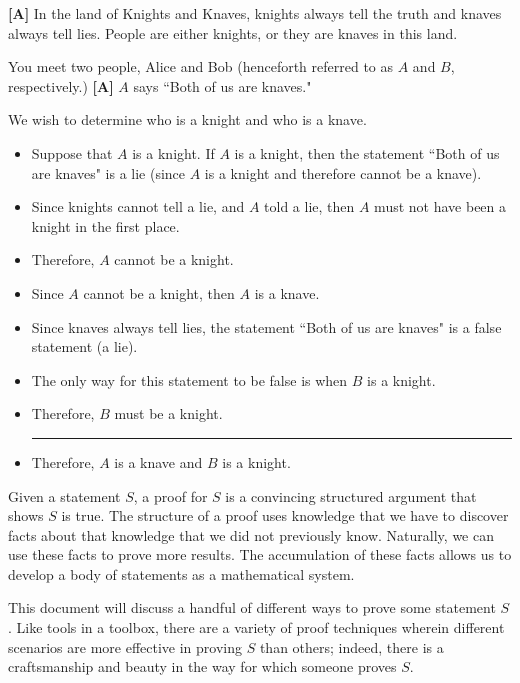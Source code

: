 \documentclass[../proofs.tex]{subfiles}
\newcommand{\hrulesmall}{\rule{0.4\textwidth}{1pt}}
\newcommand{\assump}{\textbf{[A]}}
\newcommand{\deduct}{\textbf{[D]}}
\begin{document}
\begin{expl}
\assump{} In the land of Knights and Knaves, knights always tell the truth and
knaves always tell lies. People are either knights, or they are knaves in this
land.

You meet two people, Alice and Bob (henceforth referred to as $A$ and $B$,
respectively.) \assump{} $A$ says ``Both of us are knaves."

We wish to determine who is a knight and who is a knave.

\begin{itemize}
  \item[\deduct] Suppose that $A$ is a knight. If $A$ is a knight, then the
        statement ``Both of us are knaves" is a lie (since $A$ is a knight and
        therefore cannot be a knave).
  \item[\deduct] Since knights cannot tell a lie, and $A$ told a lie, then $A$
        must not have been a knight in the first place.
  \item[\deduct] Therefore, $A$ cannot be a knight.
  \item[\deduct] Since $A$ cannot be a knight, then $A$ is a knave.
  \item[\deduct] Since knaves always tell lies, the statement ``Both of us are
        knaves" is a false statement (a lie).
  \item[\deduct] The only way for this statement to be false is when $B$ is a
       knight.
  \item[\deduct] Therefore, $B$ must be a knight. \newline \hrulesmall
  \item[\deduct] Therefore, $A$ is a knave and $B$ is a knight.
\end{itemize}
\end{expl}

Given a statement $S$, a proof for $S$ is a convincing structured argument that
shows $S$ is true. The structure of a proof uses knowledge that we have to
discover facts about that knowledge that we did not previously know. Naturally,
we can use these facts to prove more results. The accumulation of these facts
allows us to develop a body of statements as a mathematical system.


This document will discuss a handful of different ways to prove some statement
$S$. Like tools in a toolbox, there are a variety of proof techniques wherein
different scenarios are more effective in proving $S$ than others; indeed, there
is a craftsmanship and beauty in the way for which someone proves $S$.
\end{document}
